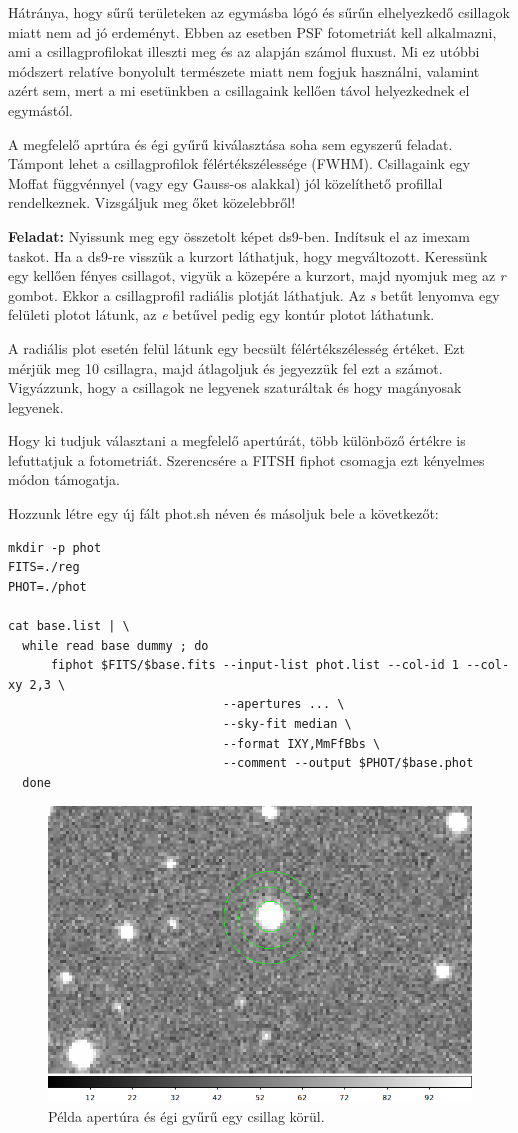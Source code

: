 \documentclass{article}
\begin{document}
Hátránya, hogy sűrű területeken az egymásba lógó és sűrűn elhelyezkedő
csillagok miatt nem ad jó erdeményt. Ebben az esetben PSF fotometriát kell
alkalmazni, ami a csillagprofilokat illeszti meg és az alapján számol fluxust.
Mi ez utóbbi módszert relatíve bonyolult természete miatt nem fogjuk használni,
valamint azért sem, mert a mi esetünkben a csillagaink kellően távol
helyezkednek el egymástól.

A megfelelő aprtúra és égi gyűrű kiválasztása soha sem egyszerű feladat. Támpont
lehet a csillagprofilok félértékszélessége (FWHM). Csillagaink egy Moffat
függvénnyel (vagy egy Gauss-os alakkal) jól közelíthető profillal rendelkeznek.
Vizsgáljuk meg őket közelebbről!

{\bf Feladat:}
Nyissunk meg egy összetolt képet ds9-ben. Indítsuk el az imexam taskot.
Ha a ds9-re visszük a kurzort láthatjuk, hogy megváltozott. Keressünk egy
kellően fényes csillagot, vigyük a közepére a kurzort, majd nyomjuk meg az
{\it r} gombot. Ekkor a csillagprofil radiális plotját láthatjuk. Az {\it s}
betűt lenyomva egy felületi plotot látunk, az {\it e} betűvel pedig egy kontúr
plotot láthatunk.

A radiális plot esetén felül látunk egy becsült félértékszélesség értéket.
Ezt mérjük meg 10 csillagra, majd átlagoljuk és jegyezzük fel ezt a számot.
Vigyázzunk, hogy a csillagok ne legyenek szaturáltak és hogy magányosak
legyenek.


Hogy ki tudjuk választani a megfelelő apertúrát, több különböző értékre is
lefuttatjuk a fotometriát. Szerencsére a FITSH fiphot csomagja ezt kényelmes
módon támogatja.

Hozzunk létre egy új fált phot.sh néven és másoljuk bele a következőt:

\begin{verbatim}
mkdir -p phot
FITS=./reg
PHOT=./phot

cat base.list | \
  while read base dummy ; do
      fiphot $FITS/$base.fits --input-list phot.list --col-id 1 --col-xy 2,3 \
                              --apertures ... \
                              --sky-fit median \
                              --format IXY,MmFfBbs \
                              --comment --output $PHOT/$base.phot
  done
\end{verbatim}

\begin{figure}[ht!]
    \centering
    \includegraphics[width=0.6\linewidth]{pics/aperture.png}
    \caption{Példa apertúra és égi gyűrű egy csillag körül.}
    \label{apert}
\end{figure}
\end{document}
